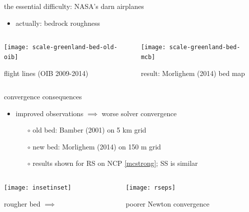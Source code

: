 \documentclass[xcolor={dvipsnames}]{beamer}
\begin{document}
\begin{frame}{the essential difficulty: NASA's darn airplanes}

\begin{itemize}
\item actually: \alert{bedrock roughness}
\end{itemize}

\begin{columns}
\begin{column}{0.5\textwidth}
\hspace{10mm} \texttt{[image: scale-greenland-bed-old-oib]}

\footnotesize \hspace{5mm} flight lines (OIB 2009-2014)
\end{column}
\begin{column}{0.6\textwidth}
\vspace{-8mm}

\hspace{10mm} \texttt{[image: scale-greenland-bed-mcb]} 

\footnotesize result: Morlighem (2014) bed map
\end{column}
\end{columns}

\end{frame}



\begin{frame}{convergence consequences}

\begin{itemize}
\item improved observations $\implies$ worse solver convergence
  \begin{itemize}
  \item[$\circ$] old bed: Bamber (2001) on 5 km grid
  \item[$\circ$] new bed: Morlighem (2014) on 150 m grid
  \item[$\circ$] results shown for RS on NCP \eqref{mcstrong}; SS is similar
  \end{itemize}
\end{itemize}

\begin{columns}
\begin{column}{0.4\textwidth}
\texttt{[image: insetinset]}

rougher bed \hfill $\implies$ \phantom{sddf}
\end{column}
\begin{column}{0.6\textwidth}
\texttt{[image: rseps]}

poorer Newton convergence
\end{column}
\end{columns}
\end{frame}
\end{document}
